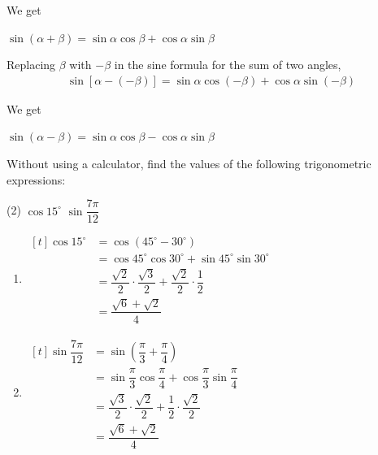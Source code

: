 \documentclass{report}
\begin{document}
\noindent We get
\begin{info}
	
	$\sin (\alpha+\beta)=\sin \alpha \cos \beta+\cos \alpha \sin \beta$
\end{info}

Replacing \( \beta \) with \( -\beta \) in the sine formula for the sum of two angles,
\begin{align*}
	\sin [\alpha-(-\beta)]=\sin \alpha \cos (-\beta)+\cos \alpha \sin (-\beta) 
\end{align*}

\vspace{-2em}
\noindent We get
\begin{info}
	
	$\sin (\alpha-\beta)=\sin \alpha \cos \beta-\cos \alpha \sin \beta$
\end{info}

\begin{question}
	Without using a calculator, find the values of the following trigonometric expressions:
	\begin{tasks}[label=(\alph*)](2)
		\task $\cos 15^{\circ}$
		\task $\sin \dfrac{7 \pi}{12}$
	\end{tasks}
	    
	\sol{}
	\begin{enumerate}[label=(\alph*)]
		\item $\begin{aligned}[t] \cos 15^{\circ} & =\cos \left(45^{\circ}-30^{\circ}\right) \\ & =\cos 45^{\circ} \cos 30^{\circ}+\sin 45^{\circ} \sin 30^{\circ} \\ & =\dfrac{\sqrt{2}}{2} \cdot \dfrac{\sqrt{3}}{2}+\dfrac{\sqrt{2}}{2} \cdot \dfrac{1}{2} \\ & =\dfrac{\sqrt{6}+\sqrt{2}}{4}\end{aligned}$
		\item $\begin{aligned}[t] \sin \dfrac{7 \pi}{12} & =\sin \left(\dfrac{\pi}{3}+\dfrac{\pi}{4}\right) \\ & =\sin \dfrac{\pi}{3} \cos \dfrac{\pi}{4}+\cos \dfrac{\pi}{3} \sin \dfrac{\pi}{4} \\ & =\dfrac{\sqrt{3}}{2} \cdot \dfrac{\sqrt{2}}{2}+\dfrac{1}{2} \cdot \dfrac{\sqrt{2}}{2} \\ & =\dfrac{\sqrt{6}+\sqrt{2}}{4}\end{aligned}$
	\end{enumerate}
\end{question}
\end{document}
